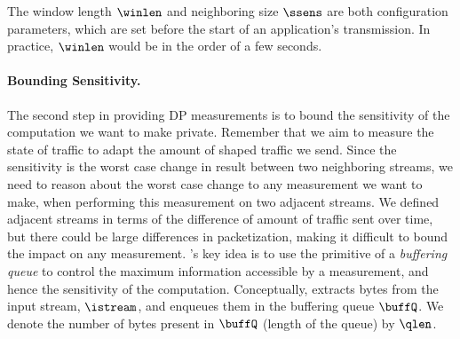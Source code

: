 The window length $\winlen$ and neighboring size $\ssens$ are both configuration
parameters, which are set before the start of an application's transmission.
In practice, $\winlen$ would be in the order of a few seconds.
%
%


\paragraph{Bounding Sensitivity.} The second step in providing DP measurements
is to bound the sensitivity of the computation we want to make private. Remember
that we aim to measure the state of traffic to adapt the amount of shaped traffic
we send.
Since the sensitivity is the worst case change in result between two neighboring
streams, we need to reason about the worst case change to any measurement we want
to make, when performing this measurement on two adjacent streams.
We defined adjacent streams in terms of the difference of amount of traffic sent
over time, but there could be large differences in packetization, making it
difficult to bound the impact on any measurement.
%
\sys's key idea is to use the primitive of a {\em buffering queue} to control
the maximum information accessible by a measurement, and hence the sensitivity
of the computation.
Conceptually, {\sys} extracts bytes from the input stream, $\istream$, and
enqueues them in the buffering queue $\buffQ$.
We denote the number of bytes present in $\buffQ$ (\ie length of the queue) by
$\qlen$.

